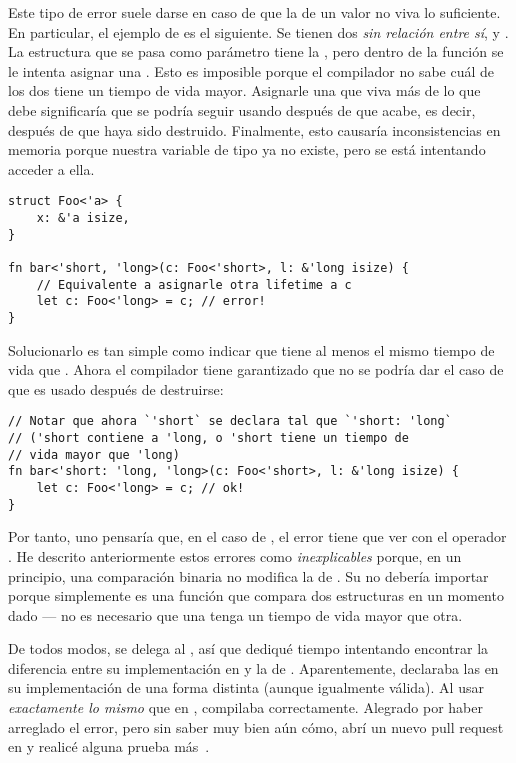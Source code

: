 Este tipo de error suele darse en caso de que la \lifetime de un valor no viva
lo suficiente. En particular, el ejemplo de  es el
siguiente. Se tienen dos \lifetimes \emph{sin relación entre sí}, 
y . La estructura  que se pasa como parámetro tiene la
\lifetime {}, pero dentro de la función se le intenta asignar una
\lifetime {}. Esto es imposible porque el compilador no sabe cuál de
los dos tiene un tiempo de vida mayor. Asignarle una \lifetime que viva más de
lo que debe significaría que se podría seguir usando  después de que
 acabe, es decir, después de que  haya sido destruido.
Finalmente, esto causaría inconsistencias en memoria porque nuestra variable de
tipo  ya no existe, pero se está intentando acceder a ella.

\begin{verbatim}
struct Foo<'a> {
    x: &'a isize,
}

fn bar<'short, 'long>(c: Foo<'short>, l: &'long isize) {
    // Equivalente a asignarle otra lifetime a c
    let c: Foo<'long> = c; // error!
}
\end{verbatim}

Solucionarlo es tan simple como indicar que  tiene al menos el
mismo tiempo de vida que . Ahora el compilador tiene garantizado que
no se podría dar el caso de que  es usado después de destruirse:

\begin{verbatim}
// Notar que ahora `'short` se declara tal que `'short: 'long`
// ('short contiene a 'long, o 'short tiene un tiempo de 
// vida mayor que 'long)
fn bar<'short: 'long, 'long>(c: Foo<'short>, l: &'long isize) {
    let c: Foo<'long> = c; // ok!
}
\end{verbatim}

Por tanto, uno pensaría que, en el caso de , el error tiene que ver
con el operador \rust{==}. He descrito anteriormente estos errores como
\emph{inexplicables} porque, en un principio, una comparación binaria no
modifica la \lifetime de . Su \lifetime no debería importar
porque simplemente es una función que compara dos estructuras en un momento
dado --- no es necesario que una tenga un tiempo de vida mayor que otra.

De todos modos, \rust{==} se delega al
\trait {}, así que dediqué tiempo intentando encontrar la
diferencia entre su implementación en  y la de . Aparentemente,  declaraba las \lifetimes en su
implementación de una forma distinta (aunque igualmente válida). Al usar
\emph{exactamente lo mismo} que en , compilaba correctamente.
Alegrado por haber arreglado el error, pero sin saber muy bien aún cómo, abrí un
nuevo pull request en \abistable y realicé alguna prueba
más~\cite{fail_covariance}.

